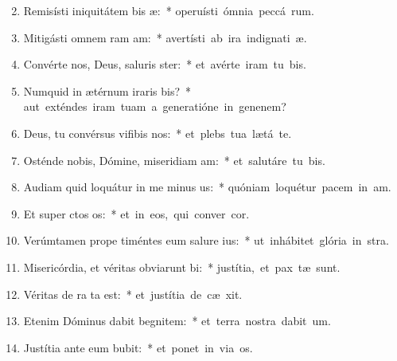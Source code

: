 \begin{flushleft}
\begin{enumerate}[leftmargin=*]
\setcounter{enumi}{1}

\item Remisísti iniquitátem bis æ:~* \mbox{operuísti ómnia peccá rum.}
\item Mitigásti omnem ram am:~* \mbox{avertísti ab ira indignati æ.}
\item Convérte nos, Deus, saluris ster:~* \mbox{et avérte iram tu  bis.}
\item Numquid in ætérnum iraris bis?~* \mbox{aut exténdes iram tuam a generatióne in genenem?}
\item Deus, tu convérsus vifibis nos:~* \mbox{et plebs tua lætá  te.}
\item Osténde nobis, Dómine, miseridiam am:~* \mbox{et salutáre tu  bis.}
\item Audiam quid loquátur in me minus us:~* \mbox{quóniam loquétur pacem in  am.}
\item Et super ctos os:~* \mbox{et in eos, qui conver  cor.}
\item Verúmtamen prope timéntes eum salure ius:~* \mbox{ut inhábitet glória in  stra.}
\item Misericórdia, et véritas obviarunt bi:~* \mbox{justítia, et pax tæ sunt.}
\item Véritas de ra ta est:~* \mbox{et justítia de cæ xit.}
\item Etenim Dóminus dabit begnitem:~* \mbox{et terra nostra dabit  um.}
\item Justítia ante eum bubit:~* \mbox{et ponet in via  os.}

\end{enumerate}
\end{flushleft}

